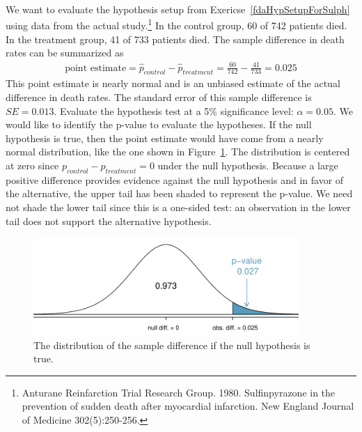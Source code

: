 \begin{example}{We want to evaluate the hypothesis setup from Exericse~\ref{fdaHypSetupForSulph} using data from the actual study.\footnote{Anturane Reinfarction Trial Research Group. 1980. Sulfinpyrazone in the prevention of sudden death after myocardial infarction. New England Journal of Medicine 302(5):250-256.} In the control group, 60 of 742 patients died. In the treatment group, 41 of 733 patients died. The sample difference in death rates can be summarized as
\begin{eqnarray*}
\text{point estimate} = \hat{p}_{control} - \hat{p}_{treatment} = \frac{60}{742} - \frac{41}{733} = 0.025
\end{eqnarray*}
This point estimate is nearly normal and is an unbiased estimate of the actual difference in death rates. The standard error of this sample difference is $SE = 0.013$. Evaluate the hypothesis test at a 5\% significance level: $\alpha=0.05$.}
We would like to identify the p-value to evaluate the hypotheses. If the null hypothesis is true, then the point estimate would have come from a nearly normal distribution, like the one shown in Figure~\ref{sulphStudyFindPValueUsingNormalApprox}. The distribution is centered at zero since $p_{control}-p_{treatment}=0$ under the null hypothesis. Because a large positive difference provides evidence against the null hypothesis and in favor of the alternative, the upper tail has been shaded to represent the p-value. We need not shade the lower tail since this is a one-sided test: an observation in the lower tail does not support the alternative hypothesis.

\begin{figure}[bt]
   \centering
   \includegraphics[height=37mm]{ch_inference_foundations_oi_biostat/figures/sulphStudyFindPValueUsingNormalApprox/sulphStudyFindPValueUsingNormalApprox}
   \caption{The distribution of the sample difference if the null hypothesis is true.}
   \label{sulphStudyFindPValueUsingNormalApprox}
\end{figure}


\end{example}
